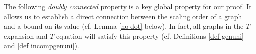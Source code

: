 \documentclass{article}
\newcommand{\1}{\mathds{1}}
\numberwithin{equation}{section}
\newcommand{\be}{\begin{equation}}
\newcommand{\ee}{\end{equation}}
\theoremstyle{plain} %
\theoremstyle{remark}
\newtheorem{remark}[theorem]{Remark}
\newcommand{\incomp}{{\text{$T$-equation}}}
\begin{document}

 
The following \emph{doubly connected} property is a key global property for our proof. It allows us to establish a direct connection between the scaling order of a graph and a bound on its value (cf. Lemma \ref{no dot} below). In fact, all graphs in the $T$-expansion and $\incomp$ will satisfy this property (cf. Definitions \ref{def genuni} and \ref{def incompgenuni}). 
\end{document}

